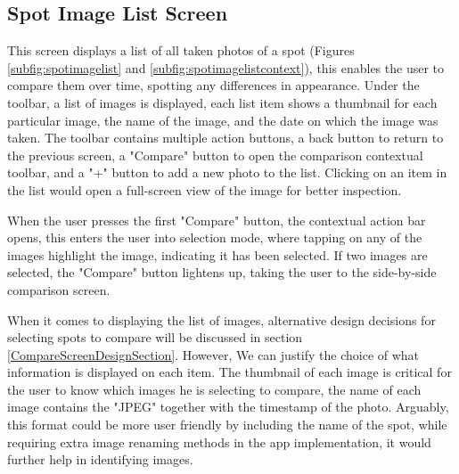 \subsection{Spot Image List Screen}

This screen displays a list of all taken photos of a spot (Figures \ref{subfig:spotimagelist} and \ref{subfig:spotimagelistcontext}), this enables the user to compare them over time, spotting any differences in appearance. Under the toolbar, a list of images is displayed, each list item shows a thumbnail for each particular image, the name of the image, and the date on which the image was taken. The toolbar contains multiple action buttons, a back button to return to the previous screen, a "Compare" button to open the comparison contextual toolbar, and a "+" button to add a new photo to the list. Clicking on an item in the list would open a full-screen view of the image for better inspection.

When the user presses the first "Compare" button, the contextual action bar opens, this enters the user into selection mode, where tapping on any of the images highlight the image, indicating it has been selected. If two images are selected, the "Compare" button lightens up, taking the user to the side-by-side comparison screen.

When it comes to displaying the list of images, alternative design decisions for selecting spots to compare will be discussed in section \ref{CompareScreenDesignSection}. However, We can justify the choice of what information is displayed on each item. The thumbnail of each image is critical for the user to know which images he is selecting to compare, the name of each image contains the "JPEG" together with the timestamp of the photo. Arguably, this format could be more user friendly by including the name of the spot, while requiring extra image renaming methods in the app implementation, it would further help in identifying images.

